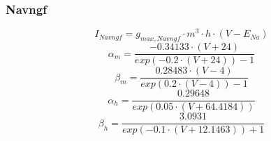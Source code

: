 \documentclass[12pt]{article}
\begin{document}
\subsubsection{Navngf}
\begin{equation}
I_{Navngf} = g_{max, Navngf} \cdot m^3 \cdot h \cdot (V - E_{Na})
\end{equation}
\begin{equation}
\alpha_m = \frac{-0.34133 \cdot (V + 24)}{exp(-0.2\cdot(V+24)) - 1}
\end{equation}
\begin{equation}
\beta_m = \frac{0.28483 \cdot (V -4)}{exp(0.2\cdot(V-4)) - 1}
\end{equation}
\begin{equation}
\alpha_h = \frac{0.29648}{exp(0.05\cdot(V+64.4184))}
\end{equation}
\begin{equation}
\beta_h = \frac{3.0931}{exp(-0.1\cdot(V+12.1463)) + 1}
\end{equation}
\end{document}
